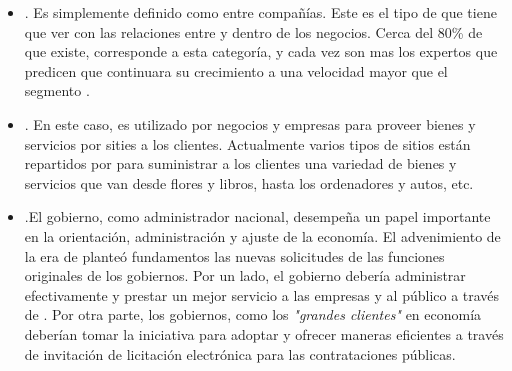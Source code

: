 \begin{itemize}
	\item \textbf{\btob}. Es simplemente definido como \ecommerce entre compañías. Este es el tipo de \ecommerce que tiene que ver con las relaciones entre y dentro de los negocios. Cerca del 80\% de \ecommerce que existe, corresponde a esta categoría, y cada vez son mas los expertos que predicen que \btob \ecommerce continuara su crecimiento a una velocidad mayor que el segmento \btoc.


	\item \textbf{\btoc}. En este caso, \internet es utilizado por negocios y empresas para proveer bienes y servicios por sities \web a los clientes. Actualmente varios tipos de sitios \web \btoc están repartidos por \internet para suministrar a los clientes una variedad de bienes y servicios que van desde flores y libros, hasta los ordenadores y autos, etc.

	\item \textbf{\btog}.El gobierno, como administrador nacional, desempeña un papel importante en la orientación, administración y ajuste de la economía. El advenimiento de la era de \ecommerce planteó fundamentos \ecommerce las nuevas solicitudes de las funciones originales de los gobiernos. Por un lado, el gobierno debería  administrar \emarket efectivamente y prestar un mejor servicio a las empresas y al público a través de \egoverment. Por otra parte, los gobiernos, como los \textit{"grandes clientes"} en economía deberían tomar la iniciativa para adoptar \ecommerce y ofrecer maneras eficientes a través de invitación de licitación electrónica para las contrataciones públicas.



\end{itemize}
